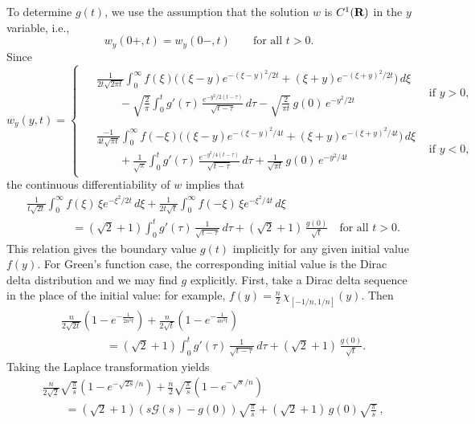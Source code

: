 \documentclass[11pt]{amsart}
\def\bfR{{\bf R}}
\begin{document}
To determine $g(t)$, we use the assumption that the solution $w$ is $C^1(\bfR)$ in the $y$ variable, i.e.,
\[ w_y(0+,t) = w_y(0-,t) \qquad \text{for all $t > 0$.} \]
Since
\[w_y(y,t)=
\begin{cases}
\begin{split}
& \textstyle \frac{1}{2t \sqrt{2\pi t}} \int_0^\infty f(\xi) \big( (\xi-y) e^{-(\xi-y)^2/2t} + (\xi+y) e^{-(\xi+y)^2/2t} \big) \,d\xi \\
& \textstyle \qquad - \sqrt{\frac{2}{\pi}} \int_0^t g'(\tau) \, \frac{e^{-y^2/2(t-\tau)}}{\sqrt{t-\tau}} \,d\tau - \sqrt{\frac{2}{\pi t}} \,g(0) \,e^{-y^2/2t}
\end{split}
& \text{if $y>0$,} \\
\begin{split}
& \textstyle \frac{-1}{4t \sqrt{\pi t}} \int_0^\infty f(-\xi) \big( (\xi-y) e^{-(\xi-y)^2/4t} + (\xi+y) e^{-(\xi+y)^2/4t} \big) \,d\xi \\
& \textstyle \qquad + \frac{1}{\sqrt{\pi}} \int_0^t g'(\tau) \,\frac{e^{-y^2/4(t-\tau)}}{\sqrt{t-\tau}} \,d\tau + \frac{1}{\sqrt{\pi t}} \,g(0) \,e^{-y^2/4t}
\end{split}
& \text{if $y<0$,}
\end{cases}\]
the continuous differentiability of $w$ implies that
\[ \begin{split}
& \frac{1}{t \sqrt{2t}} \int_0^\infty f(\xi) \,\xi e^{-\xi^2/2t}\,d\xi + \frac{1}{2t \sqrt{t}} \int_0^\infty f(-\xi) \, \xi e^{-\xi^2/4t} \,d\xi \\
& \qquad\qquad = (\sqrt{2}+1) \int_0^t g'(\tau) \, \frac{1}{\sqrt{t-\tau}} \,d\tau + (\sqrt{2} + 1) \,\frac{g(0)}{\sqrt{t}} \quad \text{for all $t > 0$.}
\end{split} \]
This relation gives the boundary value $g(t)$ implicitly for any given initial value $f(y)$. For Green's function case, the corresponding initial value is the Dirac delta distribution and we may find $g$ explicitly. First, take a Dirac delta sequence in the place of the initial value: for example, $f(y) = \frac{n}{2} \,\chi_{[-1/n,1/n]}(y)$. Then
\[ \begin{split}
&\frac{n}{2\sqrt{2t}} (1 - e^{-\frac{1}{2n^2 t}}) + \frac{n}{2\sqrt{t}} (1 - e^{-\frac{1}{4n^2 t}}) \\
& \qquad\qquad = (\sqrt{2} + 1) \int_0^t g'(\tau) \,\frac{1}{\sqrt{t-\tau}} \,d\tau + (\sqrt{2} + 1) \, \frac{g(0)}{\sqrt{t}}.
\end{split} \]
Taking the Laplace transformation yields
\[ \begin{split}
& \frac{n}{2\sqrt{2}} \sqrt{\frac{\pi}{s}} (1 - e^{-\sqrt{2s}/n}) + \frac{n}{2} \sqrt{\frac{\pi}{s}} (1 - e^{-\sqrt{s}/n} ) \\
& \qquad = (\sqrt{2} + 1) (s \mathcal{G} (s) - g(0)) \sqrt{\frac{\pi}{s}} + (\sqrt{2} + 1) \,g(0) \sqrt{\frac{\pi}{s}}\ ,
\end{split} \]
\end{document}
